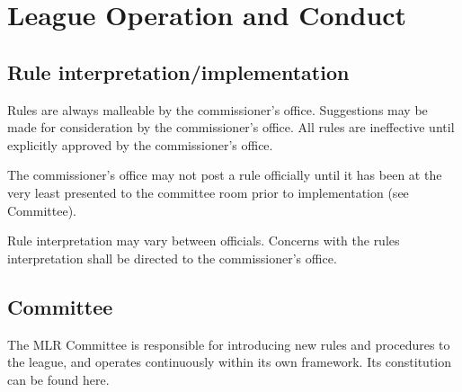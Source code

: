 
\section{League Operation and Conduct}

\subsection{Rule interpretation/implementation}
\begin{deepEnumerate}
    \item Rules are always malleable by the commissioner's office.
          Suggestions may be made for consideration by the commissioner's office.
          All rules are ineffective until explicitly approved by the commissioner's office.
    \item The commissioner’s office may not post a rule officially 
          until it has been at the very least presented to the committee room 
          prior to implementation (see Committee). %
    \item Rule interpretation may vary between officials.
          Concerns with the rules interpretation shall be directed to the commissioner’s office.
\end{deepEnumerate}

\subsection{Committee}
\begin{deepEnumerate}
    \item The MLR Committee is responsible for introducing new rules and procedures to the league,
          and operates continuously within its own framework.
          Its constitution can be found here. %
\end{deepEnumerate}

